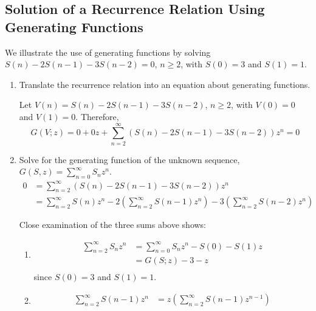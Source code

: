 \documentclass[10pt,]{book}
\theoremstyle{plain}
\theoremstyle{definition}
\theoremstyle{definition}
\theoremstyle{definition}
\theoremstyle{definition}
\numberwithin{equation}{section}
\begin{document}
\subsection[Solution of a Recurrence Relation Using Generating Functions]{Solution of a Recurrence Relation Using Generating Functions}\label{ss-solution-of-rr-using-generating-functions}
We illustrate the use of generating functions by solving
 \(S(n) - 2S(n - 1) - 3S(n - 2) = 0\), \(n \geq  2\), with \(S(0) = 3\) and \(S(1) = 1\).%
\par
\leavevmode%
\begin{enumerate}[label=\arabic*]
\item\hypertarget{li-65}{} Translate the recurrence relation into an equation about generating functions.%
\par
Let \(V(n) = S(n) - 2S (n - 1) - 3S (n - 2)\), \(n \geq  2\), with \(V(0) = 0\) and \(V(1) = 0\). Therefore,
\[G(V;z) = 0 + 0z +\sum_{n=2}^{\infty}  (S(n) - 2S (n - 1) - 3S (n - 2)) z^n= 0\]
%
\item\hypertarget{li-66}{}Solve for the generating function of the unknown sequence,\(G(S,z) = \sum_{n=0}^{\infty} S_n z^n\).
 \begin{equation*}
 \begin{split}
 0 & =\sum_{n=2}^{\infty}  (S(n) - 2S (n - 1) - 3S (n - 2)) z^n\\
 	& =\sum_{n=2}^{\infty} S(n) z^n-2 (\sum_{n=2}^{\infty
} S(n-1) z^n)-3(\sum_{n=2}^{\infty} S(n-2) z^n)
\end{split}
\end{equation*}
%
\par
Close examination of the three sums above shows:%
\par
%
\begin{enumerate}[label=\alph*]
\item\hypertarget{li-67}{}
\begin{equation*}
\begin{split}
\sum_{n=2}^{\infty} S_n z^n &=\sum_{n=0}^{\infty} S_n z^n - S(0)-S(1)z\\
			&= G(S;z)-3-z\\
\end{split}
\end{equation*}
since \(S(0)=3\) and \(S(1)=1\).%
\item\hypertarget{li-68}{}
\begin{equation*}
\begin{split}
\sum_{n=2}^{\infty} S(n-1) z^n &=z(\sum_{n=2}^{\infty} S(n-1) z^{n-1})\\

\end{split}
\end{equation*}
\end{enumerate}
\end{enumerate}
\end{document}
